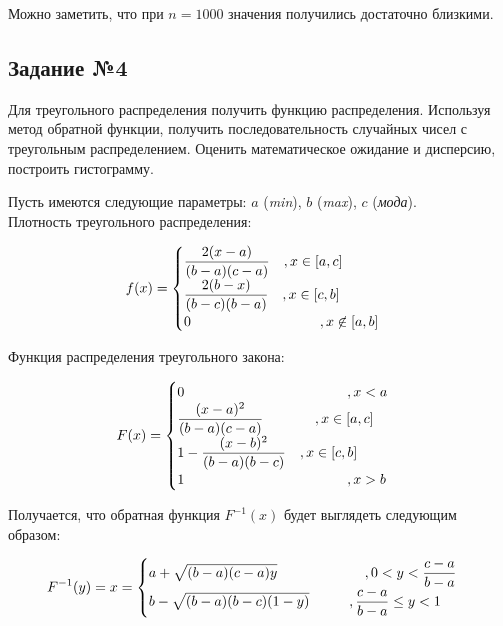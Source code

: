 \documentclass[14pt,fleqn]{extarticle}
\begin{document}
	Можно заметить, что при $n = 1000$ значения получились достаточно близкими.
	
	\newpage
	\subsection*{Задание №4}
	Для треугольного распределения получить функцию распределения. Используя метод обратной функции, получить последовательность случайных чисел с треугольным распределением. Оценить математическое ожидание и дисперсию, построить гистограмму.\\
	\newline
	
	Пусть имеются следующие параметры: $a$ (\textit{min}), $b$ (\textit{max}), $c$ (\textit{мода}).\\
    Плотность треугольного распределения:
    \begin{ceqn}
	\begin{align*}
		f(x) =
		\begin{cases}
			\dfrac{2(x-a)}{(b-a)(c-a)} \quad , x \in [a,c]\\
			\dfrac{2(b-x)}{(b-c)(b-a)} \quad , x \in [c,b]\\
			0 \hspace{3.25cm} , x \centernot\in [a,b]\\
		\end{cases}
	\end{align*}
    \end{ceqn}

    Функция распределения треугольного закона:
    \begin{ceqn}
	\begin{align*}
		F(x) =
		\begin{cases}
			0 \hspace{4.1cm} , x < a\\
			\dfrac{(x-a)^2}{(b-a)(c-a)} \hspace{1.3cm} , x \in [a,c]\\
			1 - \dfrac{(x-b)^2}{(b-a)(b-c)} \quad , x \in [c,b]\\
			1 \hspace{4.1cm} , x > b\\
		\end{cases}
	\end{align*}
    \end{ceqn}

	Получается, что обратная функция $F^{-1}(x)$ будет выглядеть следующим образом:
	\begin{ceqn}
	\begin{align*}
		F^{-1}(y) = x =
		\begin{cases}
			a + \sqrt{(b-a)(c-a)y} \hspace{2.2cm} , 0 < y < \dfrac{c-a}{b-a}\\
			b - \sqrt{(b-a)(b-c)(1-y)} \hspace{1cm} , \dfrac{c-a}{b-a} \leq y < 1\\
		\end{cases}
	\end{align*}
    \end{ceqn}
\end{document}
